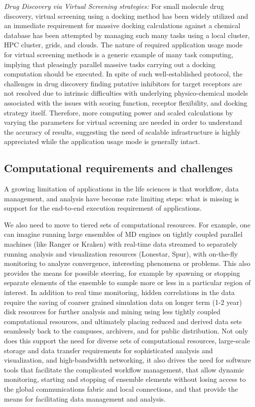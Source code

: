 \documentclass{sig-alternate}
\begin{document}
\textit{Drug Discovery via Virtual Screening strategies:} For small
molecule drug discovery, virtual screening using a docking method has
been widely utilized and an immediate requirement for massive docking
calculations against a chemical database has been attempted by
managing such many tasks using a local cluster, HPC cluster, grids,
and clouds\cite{levesque2009,yim2010}.  The nature of required
application usage mode for virtual screening methods is a generic
example of many task computing, implying that pleasingly parallel
massive tasks carrying out a docking computation should be executed.
In spite of such well-established protocol, the challenges in drug
discovery finding putative inhibitors for target receptors are not
resolved due to intrinsic difficulties with underlying
physico-chemical models associated with the issues with scoring
function, receptor flexibility, and docking strategy
itself.  Therefore, more computing power and scaled
calculations by varying the parameters for virtual screening are
needed in order to understand the accuracy of results, suggesting the
need of scalable infrastructure is highly appreciated while the
application usage mode is generally intact.

\subsection{Computational requirements and challenges}

A growing limitation of applications in the life sciences is that
workflow, data management, and analysis have become rate limiting
steps: what is missing is support for the end-to-end execution
requirement of applications.

We also need to move to tiered sets of computational resources.  For
example, one can imagine running large ensembles of MD engines on
tightly coupled parallel machines (like Ranger or Kraken) with
real-time data streamed to separately running analysis and
visualization resources (Lonestar, Spur), with on-the-fly monitoring
to analyze convergence, interesting phenomena or problems.  This also
provides the means for possible steering, for example by spawning or
stopping separate elements of the ensemble to sample more or less in a
particular region of interest.  In addition to real time monitoring,
hidden correlations in the data require the saving of coarser grained
simulation data on longer term (1-2 year) disk resources for further
analysis and mining using less tightly coupled computational
resources, and ultimately placing reduced and derived data sets
seamlessly back to the campuses, archivers, and for public
distribution.  Not only does this support the need for diverse sets of
computational resources, large-scale storage and data transfer
requirements for sophisticated analysis and visualization, and
high-bandwidth networking, it also drives the need for software tools
that facilitate the complicated workflow management, that allow
dynamic monitoring, starting and stopping of ensemble elements without
losing access to the global communications fabric and local
connections, and that provide the means for facilitating data
management and analysis.
\end{document}
